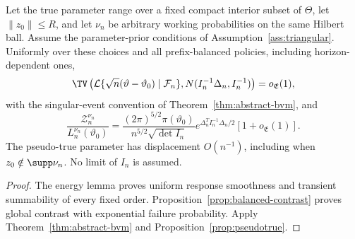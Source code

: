 \begin{theorem}
\label{thm:lattice-bvm}
Let the true parameter range over a fixed compact interior subset of
\(\Theta\), let \(\|z_0\|\le R\), and let \(\nu_n\) be arbitrary
working probabilities on the same Hilbert ball. Assume the parameter-prior
conditions of Assumption~\ref{ass:triangular}. Uniformly over these choices
and all prefix-balanced policies, including horizon-dependent ones,
\begin{equation}
 \TV\left(\mathcal L\{\sqrt n(\vartheta-\vartheta_0)\mid\mathcal F_n\},
 N(I_n^{-1}\Delta_n,I_n^{-1})\right)=o_{\mathfrak E}(1),
 \label{eq:five-bvm}
\end{equation}
with the singular-event convention of Theorem~\ref{thm:abstract-bvm}, and
\begin{equation}
 \frac{\mathcal Z_n^{\nu_n}}{L_n^{\nu_n}(\vartheta_0)}
 =\frac{(2\pi)^{5/2}\pi(\vartheta_0)}{n^{5/2}\sqrt{\det I_n}}
 e^{\Delta_n^TI_n^{-1}\Delta_n/2}[1+o_{\mathfrak E}(1)].
 \label{eq:five-evidence}
\end{equation}
The pseudo-true parameter has displacement \(O(n^{-1})\), including when
\(z_0\notin\supp\nu_n\). No limit of \(I_n\) is assumed.
\end{theorem}
\begin{proof}
The energy lemma proves uniform response smoothness and transient
summability of every fixed order. Proposition~\ref{prop:balanced-contrast}
proves global contrast with exponential failure probability. Apply
Theorem~\ref{thm:abstract-bvm} and Proposition~\ref{prop:pseudotrue}.
\end{proof}
